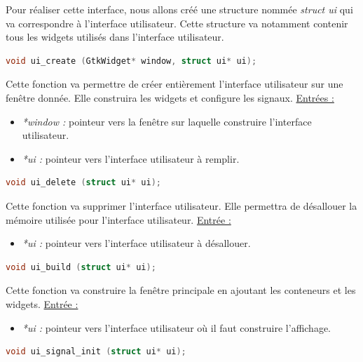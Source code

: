 \documentclass[11pt]{article}
\begin{document}
Pour réaliser cette interface, nous allons créé une structure nommée 
\textit{struct ui} qui va correspondre à l'interface utilisateur. Cette 
structure va notamment contenir tous les widgets utilisés dans l'interface 
utilisateur. 

\begin{lstlisting}[language=c]
void ui_create (GtkWidget* window, struct ui* ui);
\end{lstlisting}

Cette fonction va permettre de créer entièrement l'interface utilisateur 
sur une fenêtre donnée. Elle construira les widgets et configure les signaux. 
\newline
\underline{Entrées :} 
\begin{itemize}
\item \textit{*window :} pointeur vers la fenêtre sur laquelle construire 
l'interface utilisateur. 
\item \textit{*ui :} pointeur vers l'interface utilisateur à remplir. 
\newline 
\end{itemize}

\begin{lstlisting}[language=c]
void ui_delete (struct ui* ui);
\end{lstlisting}

Cette fonction va supprimer l'interface utilisateur. Elle permettra de 
désallouer la mémoire utilisée pour l'interface utilisateur. 
\newline
\underline{Entrée :} 
\begin{itemize}
\item \textit{*ui :} pointeur vers l'interface utilisateur à désallouer. 
\newline 
\end{itemize}

\begin{lstlisting}[language=c]
void ui_build (struct ui* ui);
\end{lstlisting}

Cette fonction va construire la fenêtre principale en ajoutant les conteneurs 
et les widgets. 
\newline
\underline{Entrée :} 
\begin{itemize}
\item \textit{*ui :} pointeur vers l'interface utilisateur où il faut construire 
l'affichage. 
\newline 
\end{itemize}

\begin{lstlisting}[language=c]
void ui_signal_init (struct ui* ui);
\end{lstlisting}
\end{document}
